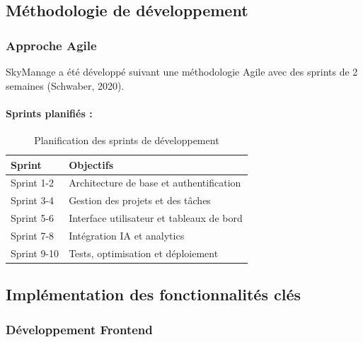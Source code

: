 \subsection{Méthodologie de développement}

\subsubsection{Approche Agile}
SkyManage a été développé suivant une méthodologie Agile avec des sprints de 2 semaines (Schwaber, 2020).

\paragraph{Sprints planifiés :}
\begin{table}[h!]
\centering
\caption{Planification des sprints de développement}
\label{tab:sprints}
\begin{tabular}{|l|p{6cm}|}
\hline
\textbf{Sprint} & \textbf{Objectifs} \\
\hline
Sprint 1-2 & Architecture de base et authentification \\
\hline
Sprint 3-4 & Gestion des projets et des tâches \\
\hline
Sprint 5-6 & Interface utilisateur et tableaux de bord \\
\hline
Sprint 7-8 & Intégration IA et analytics \\
\hline
Sprint 9-10 & Tests, optimisation et déploiement \\
\hline
\end{tabular}
\end{table}

\subsection{Implémentation des fonctionnalités clés}

\subsubsection{Développement Frontend}

